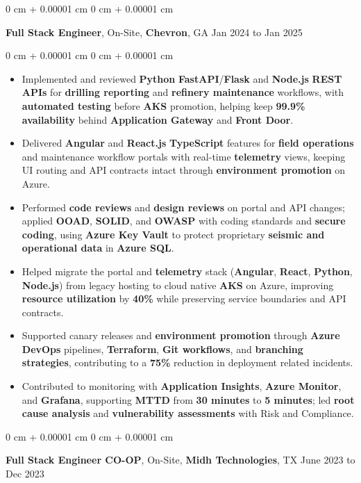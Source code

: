 \documentclass[10pt, letterpaper]{article}
\newenvironment{highlights}{
    \begin{itemize}[
        topsep=0.04 cm,
        parsep=0.04 cm,
        partopsep=0pt,
        itemsep=0pt,
        leftmargin=0 cm + 10pt
    ]
}{
    \end{itemize}
} %
\newenvironment{onecolentry}{
    \begin{adjustwidth}{
        0 cm + 0.00001 cm
    }{
        0 cm + 0.00001 cm
    }
}{
    \end{adjustwidth}
} %
\newcommand{\resumeheading}[2]{%
    \begin{onecolentry}
        #1 \hfill #2
    \end{onecolentry}
} %
\begin{document}
\vspace{0.15 cm}
\resumeheading{\textbf{Full Stack Engineer}, On-Site, \textbf{Chevron}, GA}{Jan 2024 to Jan 2025}

\begin{onecolentry}
\begin{highlights}
	\item Implemented and reviewed \textbf{Python} \textbf{FastAPI}/\textbf{Flask} and \textbf{Node.js} \textbf{REST APIs} for \textbf{drilling reporting} and \textbf{refinery maintenance} workflows, with \textbf{automated testing} before \textbf{AKS} promotion, helping keep \textbf{99.9\% availability} behind \textbf{Application Gateway} and \textbf{Front Door}.
	\item Delivered \textbf{Angular} and \textbf{React.js} \textbf{TypeScript} features for \textbf{field operations} and maintenance workflow portals with real-time \textbf{telemetry} views, keeping UI routing and API contracts intact through \textbf{environment promotion} on Azure.
	\item Performed \textbf{code reviews} and \textbf{design reviews} on portal and API changes; applied \textbf{OOAD}, \textbf{SOLID}, and \textbf{OWASP} with coding standards and \textbf{secure coding}, using \textbf{Azure Key Vault} to protect proprietary \textbf{seismic and operational data} in \textbf{Azure SQL}.
	\item Helped migrate the portal and \textbf{telemetry} stack (\textbf{Angular}, \textbf{React}, \textbf{Python}, \textbf{Node.js}) from legacy hosting to cloud native \textbf{AKS} on Azure, improving \textbf{resource utilization} by \textbf{40\%} while preserving service boundaries and API contracts.
	\item Supported canary releases and \textbf{environment promotion} through \textbf{Azure DevOps} pipelines, \textbf{Terraform}, \textbf{Git workflows}, and \textbf{branching strategies}, contributing to a \textbf{75\%} reduction in deployment related incidents.
	\item Contributed to monitoring with \textbf{Application Insights}, \textbf{Azure Monitor}, and \textbf{Grafana}, supporting \textbf{MTTD} from \textbf{30 minutes} to \textbf{5 minutes}; led \textbf{root cause analysis} and \textbf{vulnerability assessments} with Risk and Compliance.
\end{highlights}
\end{onecolentry}



\vspace{0.15 cm}
\resumeheading{\textbf{Full Stack Engineer CO-OP}, On-Site, \textbf{Midh Technologies}, TX}{June 2023 to Dec 2023}
\end{document}
